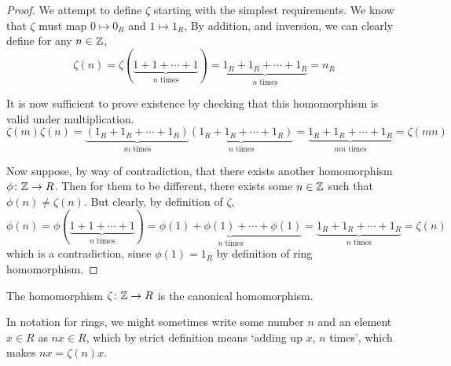 \begin{proof}
    We attempt to define \(\zeta\) starting with the simplest requirements.
    We know that \(\zeta\) must map \(0 \mapsto 0_R\) and \(1 \mapsto 1_R\),
    By addition, and inversion,
    we can clearly define for any \(n \in \mathbb{Z}\),
    \begin{equation*}
        \zeta(n) = \zeta(\underbrace{1+1+\cdots+1}_\textrm{\(n\) times})
    = \underbrace{1_R + 1_R + \cdots + 1_R}_\textrm{\(n\) times} = n_R
    \end{equation*}

    It is now sufficient to prove existence
    by checking that this homomorphism is valid under multiplication.
    \begin{equation*}
        \zeta(m)\zeta(n)
        = \underbrace{(1_R + 1_R + \cdots + 1_R)}_\textrm{\(m\) times}
        \underbrace{(1_R + 1_R + \cdots + 1_R)}_\textrm{\(n\) times}
        = \underbrace{1_R + 1_R + \cdots + 1_R}_\textrm{\(mn\) times}
        = \zeta(mn)
    \end{equation*}

    Now suppose, by way of contradiction,
    that there exists another homomorphism \(\phi\colon\mathbb{Z}\to R\).
    Then for them to be different,
    there exists some \(n \in \mathbb{Z}\) such that \(\phi(n) \neq \zeta(n)\).
    But clearly, by definition of \(\zeta\),
    \begin{equation*}
        \phi(n) = \phi(\underbrace{1+1+\cdots+1}_\textrm{\(n\) times})
        = \underbrace{\phi(1)+\phi(1)+\cdots+\phi(1)}_\textrm{\(n\) times}
        = \underbrace{1_R + 1_R + \cdots + 1_R}_\textrm{\(n\) times}
        = \zeta(n)
    \end{equation*}
    which is a contradiction,
    since \(\phi(1) = 1_R\) by definition of ring homomorphism.
\end{proof}
\begin{definition}
    The homomorphism \(\zeta\colon\mathbb{Z}\to R\)
    is the canonical homomorphism.
\end{definition}
\begin{remark}
    In notation for rings,
    we might sometimes write some number \(n\)
    and an element \(x \in R\) as \(nx \in R\),
    which by strict definition means `adding up \(x\), \(n\) times',
    which makes \(nx = \zeta(n)x\).
\end{remark}

